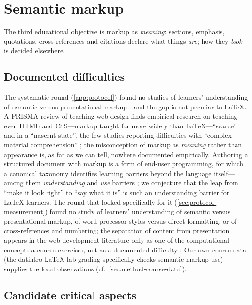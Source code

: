 \mode*
\section{Semantic markup}
\label{sec:markup}

The third educational objective is markup as \emph{meaning}: sections,
emphasis, quotations, cross-references and citations declare what things
\emph{are}; how they \emph{look} is decided elsewhere.

\subsection{Documented difficulties}

The systematic round (\cref{app:protocol}) found no studies of learners'
understanding of semantic versus presentational markup---and the gap is
not peculiar to LaTeX.
A PRISMA review of teaching web design finds empirical research on
teaching even HTML and CSS---markup taught far more widely than
LaTeX---\enquote{scarce} and in a \enquote{nascent state}, the few studies
reporting difficulties with \enquote{complex material comprehension}
\autocite{Kharchenko2025WebDesign}; the misconception of markup as
\emph{meaning} rather than appearance is, as far as we can tell, nowhere
documented empirically.
Authoring a structured document with markup is a form of end-user
programming, for which a canonical taxonomy identifies learning barriers
beyond the language itself---among them \emph{understanding} and
\emph{use} barriers \autocite{Ko2004Barriers}; we conjecture that the leap
from \enquote{make it look right} to \enquote{say what it is} is such an
understanding barrier for LaTeX learners.
The round that looked specifically for it
(\cref{sec:protocol-measurement}) found no study of learners'
understanding of semantic versus presentational markup, of word-processor
styles versus direct formatting, or of cross-references and numbering;
the separation of content from presentation appears in the
web-development literature only as one of the computational concepts a
course exercises, not as a documented difficulty \autocite{Park2011WebDev}.
Our own course data (the datintro LaTeX lab grading specifically checks
semantic-markup use) supplies the local observations
(cf.\ \cref{sec:method-course-data}).

\subsection{Candidate critical aspects}
\label{sec:markup-aspects}

